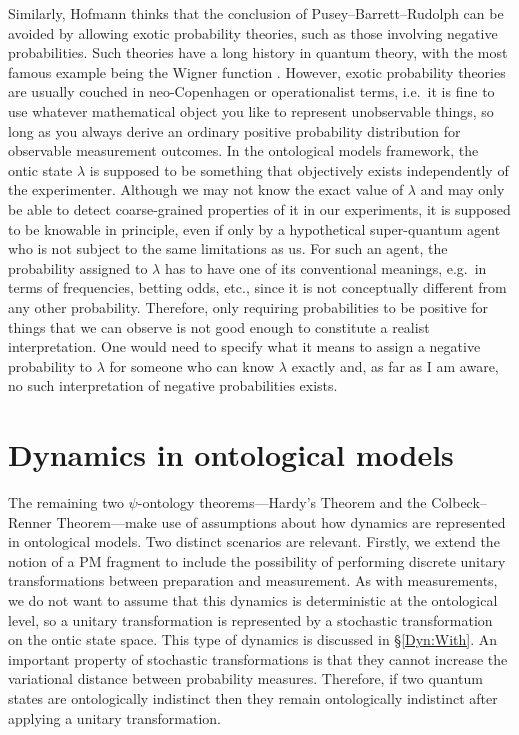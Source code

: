 \documentclass[DIV=calc,paper=a4,fontsize=11pt,twocolumn]{scrartcl} %
\theoremstyle{definition}
\theoremstyle{plain}
\begin{document}
Similarly, Hofmann \cite{Hofmann2011} thinks that the conclusion of
Pusey--Barrett--Rudolph can be avoided by allowing exotic probability theories, such as
those involving negative probabilities.  Such theories have a long
history in quantum theory, with the most famous example being the
Wigner function \cite{Wigner1932}.  However, exotic probability
theories are usually couched in neo-Copenhagen or operationalist
terms, i.e.\ it is fine to use whatever mathematical object you like
to represent unobservable things, so long as you always derive an
ordinary positive probability distribution for observable measurement
outcomes.  In the ontological models framework, the ontic state
$\lambda$ is supposed to be something that objectively exists
independently of the experimenter.  Although we may not know the exact
value of $\lambda$ and may only be able to detect coarse-grained
properties of it in our experiments, it is supposed to be knowable in
principle, even if only by a hypothetical super-quantum agent who is
not subject to the same limitations as us.  For such an agent, the
probability assigned to $\lambda$ has to have one of its conventional
meanings, e.g.\ in terms of frequencies, betting odds, etc., since it
is not conceptually different from any other probability.  Therefore,
only requiring probabilities to be positive for things that we can
observe is not good enough to constitute a realist interpretation.
One would need to specify what it means to assign a negative
probability to $\lambda$ for someone who can know $\lambda$ exactly
and, as far as I am aware, no such interpretation of negative
probabilities exists.

\section{Dynamics in ontological models}

\label{Dyn}

The remaining two $\psi$-ontology theorems---Hardy's Theorem and the
Colbeck--Renner Theorem---make use of assumptions about how dynamics
are represented in ontological models.  Two distinct scenarios are
relevant.  Firstly, we extend the notion of a PM fragment to include
the possibility of performing discrete unitary transformations between
preparation and measurement.  As with measurements, we do not want to
assume that this dynamics is deterministic at the ontological level,
so a unitary transformation is represented by a stochastic
transformation on the ontic state space.  This type of dynamics is
discussed in \S\ref{Dyn:With}.  An important property of stochastic
transformations is that they cannot increase the variational distance
between probability measures.  Therefore, if two quantum states are
ontologically indistinct then they remain ontologically indistinct
after applying a unitary transformation.
\end{document}

